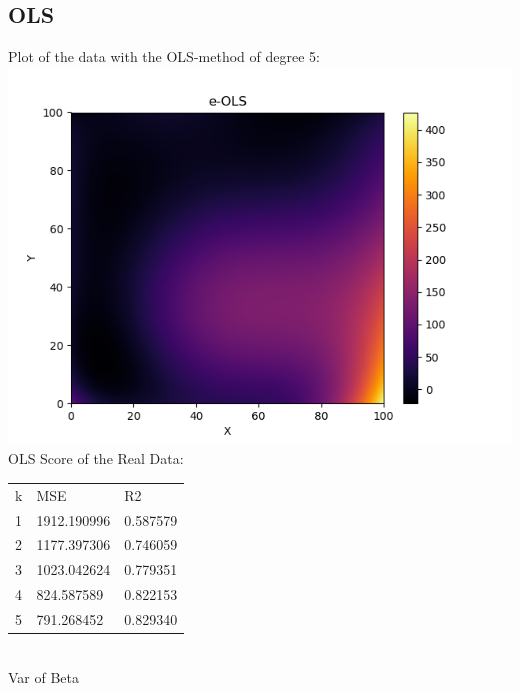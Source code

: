 \documentclass[a4paper,norsk]{article}
\begin{document}
\subsection{OLS}
Plot of the data with the OLS-method of degree 5:
\\ \includegraphics[scale=.7]{e-OLS}
\\ OLS Score of the Real Data:
\begin{table}[!h]
\begin{tabular}{lll}
k & MSE                   & R2                 \\
1 & 1912.190996  & 0.587579 \\
2 & 1177.397306  & 0.746059 \\
3 & 1023.042624  & 0.779351 \\
4 & 824.587589  & 0.822153 \\
5 & 791.268452 & 0.829340
\end{tabular}
\end{table}
\\Var of Beta
\begin{align*}
[  2.32350868e-17\quad   3.59021583e-14 \quad  9.26320612e-14\quad   6.67623760e-12\\
   2.76179532e-12\quad   2.44594128e-11 \quad  1.00899287e-09  \quad 2.82477031e-08\\
   3.26102575e-08 \quad  4.03014136e-09 \quad  7.93068781e-13  \quad 8.29815731e-12\\
   2.72417498e-12 \quad  8.99036913e-12 \quad  2.47909085e-12 \quad  4.07929803e-17\\
   2.67723887e-16 \quad  5.18767547e-16 \quad  4.23509770e-16 \quad  1.84571052e-16\\
   9.42227510e-17]
\end{align*}
\end{document}
